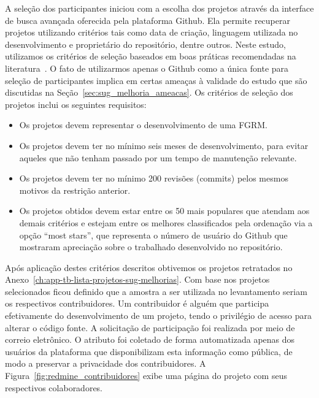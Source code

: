 A seleção dos participantes iniciou com a escolha dos projetos através da
interface de busca avançada oferecida pela plataforma Github. Ela permite
recuperar projetos utilizando critérios tais como data de criação, linguagem
utilizada no desenvolvimento e proprietário do repositório, dentre outros. Neste
estudo, utilizamos os critérios de seleção baseados em boas práticas
recomendadas na literatura~\cite{Bird2009}. O fato de utilizarmos apenas o
Github como a única fonte para seleção de participantes implica em certas
ameaças à validade do estudo que são discutidas na
Seção~\ref{sec:sug_melhoria_ameacas}. Os critérios de seleção dos projetos
inclui os seguintes requisitos:

\begin{itemize}
	\item Os projetos devem representar o desenvolvimento de uma FGRM\@.
    \item Os projetos devem ter no mínimo seis meses de desenvolvimento, para
        evitar aqueles que não tenham passado por um tempo de manutenção
        relevante.
	\item Os projetos devem  ter  no  mínimo  200  revisões (commits)  pelos
		mesmos motivos  da restrição anterior.
    \item Os projetos obtidos devem estar entre os 50 mais populares que atendam
        aos demais critérios e estejam entre os melhores classificados pela
        ordenação via a opção ``most stars'', que representa o número de usuário
        do Github que mostraram apreciação sobre o trabalhado desenvolvido no
        repositório.
\end{itemize}

Após aplicação destes critérios descritos obtivemos os projetos retratados no
Anexo~\ref{ch:app-tb-lista-projetos-sug-melhorias}. Com base nos projetos
selecionados ficou definido que a amostra a ser utilizada no levantamento seriam
os respectivos contribuidores. Um contribuidor é alguém que participa
efetivamente do desenvolvimento de um projeto, tendo o privilégio de acesso para
alterar o código fonte. A solicitação de participação foi realizada por meio de
correio eletrônico. O atributo foi coletado de forma automatizada apenas dos
usuários da plataforma que disponibilizam esta informação como pública, de modo
a preservar a privacidade dos contribuidores. A
Figura~\ref{fig:redmine_contribuidores} exibe uma página do projeto com seus
respectivos colaboradores.

